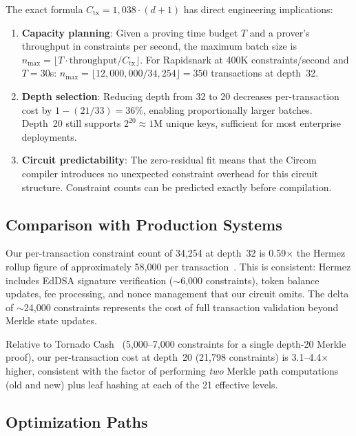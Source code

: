 The exact formula $C_{\text{tx}} = 1{,}038 \cdot (d+1)$ has direct
engineering implications:

\begin{enumerate}
\item \textbf{Capacity planning}: Given a proving time budget $T$ and a
  prover's throughput in constraints per second, the maximum batch size
  is $n_{\max} = \lfloor T \cdot \text{throughput} / C_{\text{tx}} \rfloor$.
  For Rapidsnark at 400K constraints/second and $T = 30$s:
  $n_{\max} = \lfloor 12{,}000{,}000 / 34{,}254 \rfloor = 350$ transactions
  at depth~32.

\item \textbf{Depth selection}: Reducing depth from 32 to 20 decreases
  per-transaction cost by $1 - (21/33) = 36\%$, enabling proportionally
  larger batches. Depth~20 still supports $2^{20} \approx 1$M unique
  keys, sufficient for most enterprise deployments.

\item \textbf{Circuit predictability}: The zero-residual fit means that
  the Circom compiler introduces no unexpected constraint overhead
  for this circuit structure. Constraint counts can be predicted
  exactly before compilation.
\end{enumerate}

\subsection{Comparison with Production Systems}

Our per-transaction constraint count of 34,254 at depth~32 is
0.59$\times$ the Hermez rollup figure of approximately 58,000 per
transaction~\cite{hermez2021circuits}. This is consistent: Hermez
includes EdDSA signature verification ($\sim$6,000 constraints),
token balance updates, fee processing, and nonce management that
our circuit omits. The delta of $\sim$24,000 constraints represents
the cost of full transaction validation beyond Merkle state updates.

Relative to Tornado Cash~\cite{tornadocash2019} (5,000--7,000
constraints for a single depth-20 Merkle proof), our per-transaction
cost at depth~20 (21,798 constraints) is 3.1--4.4$\times$ higher,
consistent with the factor of performing \emph{two} Merkle path
computations (old and new) plus leaf hashing at each of the 21
effective levels.

\subsection{Optimization Paths}

